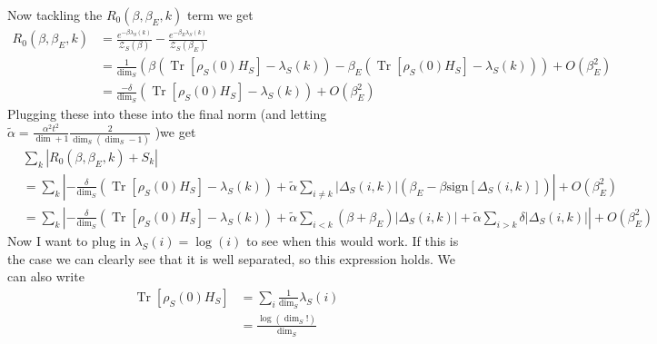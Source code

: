 \documentclass{article}
\newcommand{\parens}[1]{\left( #1 \right)}
\newcommand{\brackets}[1]{\left[ #1 \right]}
\newcommand{\abs}[1]{\left| #1 \right|}
\newcommand{\bigo}[1]{O\left( #1 \right)}
\DeclareMathOperator{\Tr}{Tr}
\newcommand{\trace}[1]{\Tr \brackets{ #1 }}
\newcommand{\partfun}{\mathcal{Z}}
\begin{document}
Now tackling the $R_0(\beta, \beta_E, k)$ term we get
\begin{align}
    R_0(\beta, \beta_E, k) &= \frac{e^{-\beta \lambda_S(k)}}{\partfun_S(\beta)} - \frac{e^{-\beta_E \lambda_S(k)}}{\partfun_S(\beta_E)} \\
    &=\frac{1}{\dim_S} \parens{\beta (\trace{\rho_S(0) H_S} - \lambda_S(k)) - \beta_E (\trace{\rho_S(0) H_S} - \lambda_S(k))} + \bigo{\beta_E^2} \\
    &= \frac{- \delta}{\dim_S} \parens{\trace{\rho_S(0) H_S} - \lambda_S(k)} + \bigo{\beta_E^2}
\end{align}
Plugging these into these into the final norm (and letting $\widetilde{\alpha} = \frac{\alpha^2 t^2}{\dim+ 1} \frac{2}{\dim_S(\dim_S - 1)}$ )we get
\begin{align}
    &\sum_k \abs{R_0(\beta, \beta_E, k) + S_k} \\
    &= \sum_k \abs{- \frac{\delta}{\dim_S}(\trace{\rho_S(0) H_S} - \lambda_S(k)) + \widetilde{\alpha} \sum_{i \neq k} |\Delta_S(i,k)|(\beta_E - \beta \text{sign} \left[ \Delta_S(i,k) \right])} + \bigo{\beta_E^2}\\
    &= \sum_k \abs{- \frac{\delta}{\dim_S}(\trace{\rho_S(0) H_S} - \lambda_S(k)) + \widetilde{\alpha} \sum_{i < k} (\beta + \beta_E)|\Delta_S(i,k)| + \widetilde{\alpha} \sum_{i > k} \delta |\Delta_S(i,k)|} + \bigo{\beta_E^2}
\end{align}
Now I want to plug in $\lambda_S(i) = \log (i)$ to see when this would work. If this is the case we can clearly see that it is well separated, so this expression holds. We can also write
\begin{align}
    \trace{\rho_S(0) H_S} &= \sum_i \frac{1}{\dim_S} \lambda_S(i) \\
    &= \frac{\log (\dim_S!)}{\dim_S}
\end{align}
\end{document}
